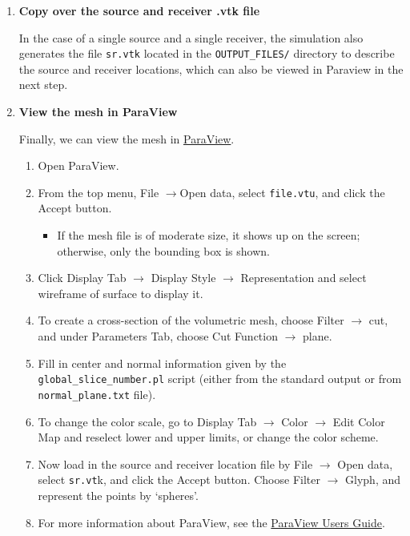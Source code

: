 \begin{enumerate}
\item \textbf{Copy over the source and receiver .vtk file}


In the case of a single source and a single receiver, the simulation
also generates the file \texttt{sr.vtk} located in the \texttt{OUTPUT\_FILES/}
directory to describe the source and receiver locations, which can
also be viewed in Paraview in the next step.

\item \textbf{View the mesh in ParaView}


Finally, we can view the mesh in \href{www.paraview.org}{ParaView}.
\begin{enumerate}
\item Open ParaView.
\item From the top menu, \textsf{File} $\rightarrow$\textsf{Open data},
select \texttt{file.vtu}, and click the \textsf{Accept} button.

\begin{itemize}
\item If the mesh file is of moderate size, it shows up on the screen; otherwise,
only the bounding box is shown.
\end{itemize}
\item Click \textsf{Display Tab} $\rightarrow$ \textsf{Display Style} $\rightarrow$
\textsf{Representation} and select \textsf{wireframe of surface} to
display it.
\item To create a cross-section of the volumetric mesh, choose \textsf{Filter}
$\rightarrow$ \textsf{cut}, and under \textsf{Parameters Tab}, choose
\textsf{Cut Function} $\rightarrow$ \textsf{plane}.
\item Fill in center and normal information given by the \texttt{global\_slice\_number.pl}
script (either from the standard output or from \texttt{normal\_plane.txt}
file).
\item To change the color scale, go to \textsf{Display Tab} $\rightarrow$
\textsf{Color} $\rightarrow$ \textsf{Edit Color Map} and reselect
lower and upper limits, or change the color scheme.
\item Now load in the source and receiver location file by \textsf{File}
$\rightarrow$ \textsf{Open data}, select \texttt{sr.vt}k, and click
the \textsf{Accept} button. Choose \textsf{Filter} $\rightarrow$
\textsf{Glyph}, and represent the points by `\textsf{spheres}'.
\item For more information about ParaView, see the
\href{www.paraview.org/files/v1.6/ParaViewUsersGuide.PDF}{ParaView Users Guide}.
\end{enumerate}
\end{enumerate}

